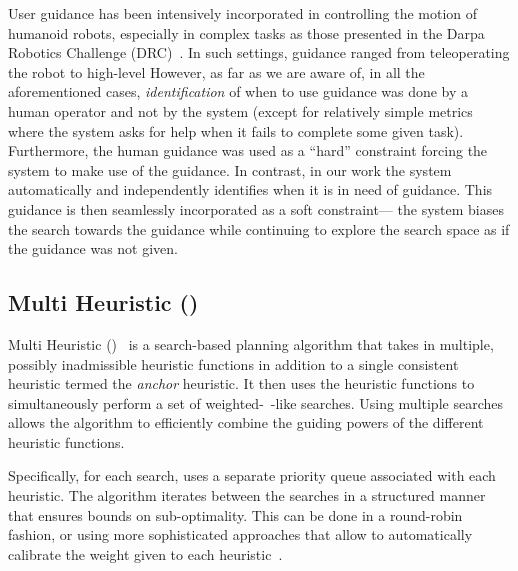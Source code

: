 \documentclass{article}
\begin{document}
User guidance has been intensively incorporated in controlling the motion of humanoid robots, especially in complex tasks as those presented in the Darpa Robotics Challenge (DRC)~\cite{drc18}.
In such settings, guidance ranged from teleoperating the robot 
to high-level 
However, as far as we are aware of, in all the aforementioned cases, \emph{identification} of when to use guidance was done by a human operator and not by the system (except for relatively simple metrics where the system asks for help when it fails to complete some given task).
Furthermore, the human guidance was used as a ``hard'' constraint forcing the system to make use of the guidance.
In contrast, in our work the system automatically and independently identifies when it is in need of guidance.
This guidance is then seamlessly incorporated as a soft constraint--- the system biases the search towards the guidance while continuing to explore the search space as if the guidance was not given.

\subsection{Multi Heuristic \astar (\mhastar)}
\label{sec:mha}
Multi Heuristic \astar (\mhastar)~\cite{NAL15,ASNHL16} is a search-based planning algorithm that takes in multiple, possibly inadmissible heuristic functions in addition to a single consistent heuristic termed the \emph{anchor} heuristic.
It then uses the heuristic functions to simultaneously perform a set of weighted-\astar~\cite{pohl1970first}-like searches.
Using multiple searches allows the algorithm to efficiently combine the guiding powers of the different heuristic functions. 

Specifically, for each search, \mhastar uses a separate priority queue associated with each heuristic. 
The algorithm iterates between the searches in a structured manner that ensures bounds on sub-optimality. 
This can be done in a round-robin fashion, or using more 
sophisticated approaches that allow to automatically calibrate the weight given to each heuristic~\cite{PNAL15}.
\end{document}
